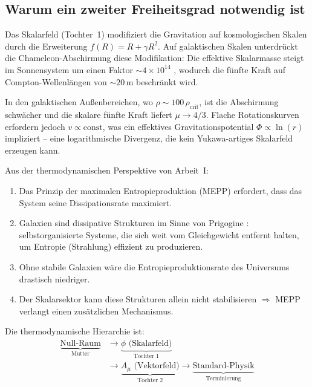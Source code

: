 \documentclass[aps,prd,twocolumn,superscriptaddress,nofootinbib]{revtex4-2}
\begin{document}
\subsection{Warum ein zweiter Freiheitsgrad notwendig ist}
\label{sec:why_vector}

Das Skalarfeld (Tochter~1) modifiziert die Gravitation auf kosmologischen Skalen durch die Erweiterung $f(R) = R + \gamma R^2$. Auf galaktischen Skalen unterdr\"uckt die Chameleon-Abschirmung diese Modifikation: Die effektive Skalarmasse steigt im Sonnensystem um einen Faktor $\sim 4 \times 10^{14}$ \cite{Geiger2026c}, wodurch die f\"unfte Kraft auf Compton-Wellenl\"angen von $\sim 20$\,m beschr\"ankt wird.

In den galaktischen Au\ss{}enbereichen, wo $\rho \sim 100\,\rho_{\mathrm{crit}}$, ist die Abschirmung schw\"acher und die skalare f\"unfte Kraft liefert $\mu \to 4/3$. Flache Rotationskurven erfordern jedoch $v \propto \mathrm{const}$, was ein effektives Gravitationspotential $\Phi \propto \ln(r)$ impliziert -- eine logarithmische Divergenz, die kein Yukawa-artiges Skalarfeld erzeugen kann.

Aus der thermodynamischen Perspektive von Arbeit~I:
\begin{enumerate}
\item Das Prinzip der maximalen Entropieproduktion (MEPP) \cite{Dewar2003,Martyushev2006} erfordert, dass das System seine Dissipationsrate maximiert.
\item Galaxien sind dissipative Strukturen im Sinne von Prigogine \cite{Prigogine1977}: selbstorganisierte Systeme, die sich weit vom Gleichgewicht entfernt halten, um Entropie (Strahlung) effizient zu produzieren.
\item Ohne stabile Galaxien w\"are die Entropieproduktionsrate des Universums drastisch niedriger.
\item Der Skalarsektor kann diese Strukturen allein nicht stabilisieren $\Rightarrow$ MEPP verlangt einen zus\"atzlichen Mechanismus.
\end{enumerate}

Die thermodynamische Hierarchie ist:
\begin{equation}
\begin{split}
\underbrace{\text{Null-Raum}}_{\text{Mutter}} &\to \underbrace{\phi \text{ (Skalarfeld)}}_{\text{Tochter 1}} \\
&\to \underbrace{A_\mu \text{ (Vektorfeld)}}_{\text{Tochter 2}} \to \underbrace{\text{Standard-Physik}}_{\text{Terminierung}}
\end{split}
\label{eq:hierarchy}
\end{equation}
\end{document}
